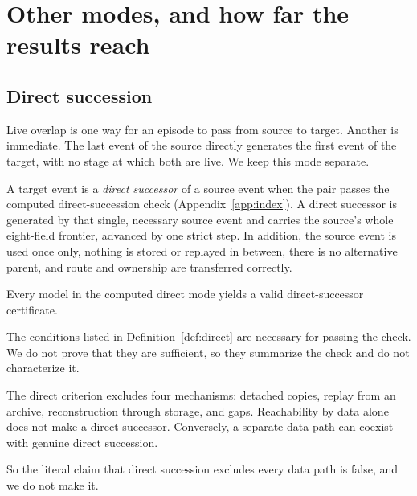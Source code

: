 \section{Other modes, and how far the results reach}
\label{sec:modes}

\subsection{Direct succession}

Live overlap is one way for an episode to pass from source to target. Another
is immediate. The last event of the source directly generates the first event
of the target, with no stage at which both are live. We keep this mode
separate.

\begin{definition}
\label{def:direct}
A target event is a \emph{direct successor} of a source event when the pair
passes the computed direct-succession check (Appendix~\ref{app:index}). A
direct successor is generated by that single, necessary source event and
carries the source's whole eight-field frontier, advanced by one strict step.
In addition, the source event is used once only, nothing is stored or replayed
in between, there is no alternative parent, and route and ownership are
transferred correctly.
\end{definition}

\begin{proposition}
\label{prop:direct}
Every model in the computed direct mode yields a valid direct-successor
certificate.
\end{proposition}

The conditions listed in Definition~\ref{def:direct} are necessary for passing
the check. We do not prove that they are sufficient, so they summarize the
check and do not characterize it.

\begin{proposition}
\label{prop:direct-exclusions}
The direct criterion excludes four mechanisms: detached copies, replay from an
archive, reconstruction through storage, and gaps. Reachability by data alone
does not make a direct successor. Conversely, a separate data path can coexist
with genuine direct succession.
\end{proposition}

So the literal claim that direct succession excludes every data path is false,
and we do not make it.

